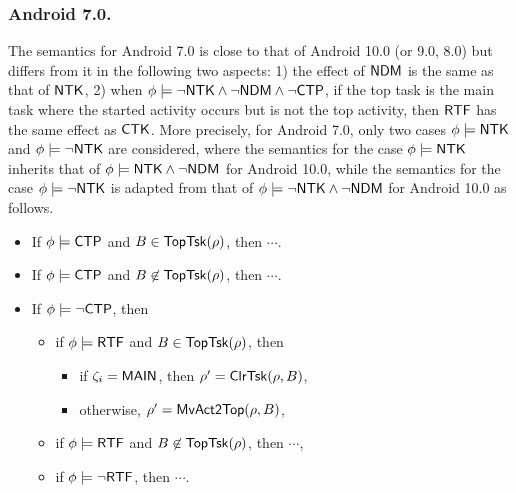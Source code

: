\subsubsection{Android 7.0.}
The semantics for Android 7.0 is close to that of Android 10.0 (or 9.0, 8.0) but differs from it in the following two aspects:  1) the effect of ${\sf NDM}$ is the same as that of ${\sf NTK}$, 2)
when $\phi \models \neg {\sf NTK} \wedge \neg{\sf NDM} \wedge \neg{\sf CTP}$, if the top task is the main task where the started activity occurs but is not the top activity, then ${\sf RTF}$ has the same effect as ${\sf CTK}$. More precisely, for Android 7.0, only two cases $\phi \models {\sf NTK}$ and $\phi  \models \neg {\sf NTK}$ are considered, where the semantics for the case $\phi \models {\sf NTK}$ inherits that of $\phi \models {\sf NTK} \wedge \neg {\sf NDM}$ for Android 10.0, while the semantics for the case $\phi  \models \neg {\sf NTK}$ is adapted from that of $\phi \models \neg {\sf NTK} \wedge \neg {\sf NDM}$ for Android 10.0 as follows. 
%
%
%
\begin{itemize}
	\item If $\phi \models {\sf CTP}$ and $B \in \mathsf{TopTsk}(\rho)$, then $\cdots$.
	\item If $\phi \models {\sf CTP}$ and $B \not \in \mathsf{TopTsk}(\rho)$, then $\cdots$.
	\item If $\phi \models \neg {\sf CTP}$, then
		\begin{itemize}
    			\item if $\phi \models {\sf RTF}$ and $B \in \mathsf{TopTsk}(\rho)$, then
    			\begin{itemize}
                    \item if $\zeta_i = {\sf MAIN}$, then $\rho' = \mathsf{ClrTsk}(\rho, B)$,
                    \item otherwise, $\rho' = \mathsf{MvAct2Top}(\rho, B)$,
    			\end{itemize}
			\item if $\phi \models {\sf RTF}$ and $B \not \in \mathsf{TopTsk}(\rho)$, then $\cdots$,
			\item if $\phi \models \neg {\sf RTF}$, then $\cdots$.
		\end{itemize}
\end{itemize}

